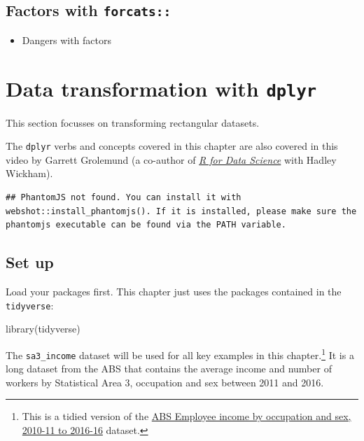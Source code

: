 \documentclass[
]{book}
\newenvironment{Shaded}{\begin{snugshade}}{\end{snugshade}}
\newcommand{\FunctionTok}[1]{\textcolor[rgb]{0.00,0.00,0.00}{#1}}
\newcommand{\NormalTok}[1]{#1}
\providecommand{\tightlist}{%
  \setlength{\itemsep}{0pt}\setlength{\parskip}{0pt}}
\begin{document}
\hypertarget{factors-with-forcats}{%
\section{\texorpdfstring{Factors with \texttt{forcats::}}{Factors with forcats::}}\label{factors-with-forcats}}

\begin{itemize}
\tightlist
\item
  Dangers with factors
\end{itemize}

\hypertarget{data-transformation-with-dplyr}{%
\chapter{\texorpdfstring{Data transformation with \texttt{dplyr}}{Data transformation with dplyr}}\label{data-transformation-with-dplyr}}

This section focusses on transforming rectangular datasets.

The \texttt{dplyr} verbs and concepts covered in this chapter are also covered in this video by Garrett Grolemund (a co-author of \emph{\href{https://r4ds.had.co.nz/}{R for Data Science}} with Hadley Wickham).

\begin{verbatim}
## PhantomJS not found. You can install it with webshot::install_phantomjs(). If it is installed, please make sure the phantomjs executable can be found via the PATH variable.
\end{verbatim}

\hypertarget{set-up}{%
\section{Set up}\label{set-up}}

Load your packages first. This chapter just uses the packages contained in the \texttt{tidyverse}:

\begin{Shaded}
\begin{Highlighting}[]
\FunctionTok{library}\NormalTok{(tidyverse)}
\end{Highlighting}
\end{Shaded}

The \texttt{sa3\_income} dataset will be used for all key examples in this chapter.\footnote{This is a tidied version of the \href{https://www.abs.gov.au/AUSSTATS/abs@.nsf/DetailsPage/6524.0.55.0022011-2016?OpenDocument}{ABS Employee income by occupation and sex, 2010-11 to 2016-16} dataset.} It is a long dataset from the ABS that contains the average income and number of workers by Statistical Area 3, occupation and sex between 2011 and 2016.
\end{document}
